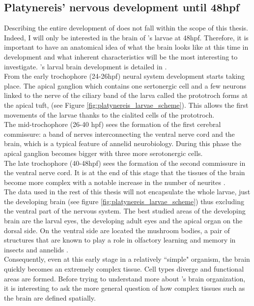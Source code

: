 	  \subsection{Platynereis' nervous development until 48hpf}
	 Describing the entire development of \platy{} does not fall within the scope of this thesis. Indeed, I will only be interested in the brain of \platy{}'s larvae at 48hpf. Therefore, it is important to have an anatomical idea of what the brain looks like at this time in development and what inherent characteristics will be the most interesting to investigate. \platy{}'s larval brain development is detailed in \cite{Fischer10}.\\
     From the early trochophore (24-26hpf) neural system development starts taking place. The apical ganglion which contains one sertonergic cell and a few neurons linked to the nerve of the ciliary band of the larva called the prototroch forms at the apical tuft, (see Figure \ref{fig:platynereis_larvae_scheme}). This allows the first movements of the larvae thanks to the cialited cells of the prototroch.\\
     The mid-trochophore (26-40 hpf) sees the formation of the first cerebral commissure: a band of nerves interconnecting the ventral nerve cord and the brain, which is a typical feature of annelid neurobiology. During this phase the apical ganglion becomes bigger with three more serotonergic cells.\\
     The late trochophore (40-48hpf) sees the formation of the second commissure in the ventral nerve cord. It is at the end of this stage that the tissues of the brain become more complex with a notable increase in the number of neurites \cite{Fischer10}.\\
     The data used in the rest of this thesis will not encapsulate the whole larvae, just the developing brain (see figure \ref{fig:platynereis_larvae_scheme}) thus excluding the ventral part of the nervous system. The best studied areas of the developing brain are the larval eyes, the developing adult eyes and the apical organ on the dorsal side. On the ventral side are located the mushroom bodies, a pair of structures that are known to play a role in olfactory learning and memory in insects and annelids \cite{Tomer10}.\\
     
     Consequently, even at this early stage in a relatively ``simple" organism, the brain quickly becomes an extremely complex tissue. Cell types diverge and functional areas are formed. Before trying to understand more about \platy{}'s brain organization, it is interesting to ask the more general question of how complex tissues such as the brain are defined spatially.
     

